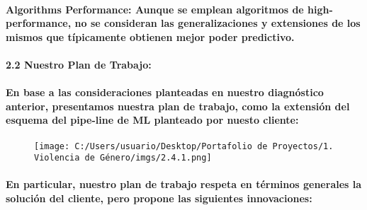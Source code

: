 \documentclass[]{article}
\let\oldparagraph\paragraph
\renewcommand{\paragraph}[1]{\oldparagraph{#1}\mbox{}}
\begin{document}
\begin{itemize}
  \paragraph{\texorpdfstring{\textbf{Algorithms Performance:} Aunque se
  emplean algoritmos de high-performance, no se consideran las
  generalizaciones y extensiones de los mismos que típicamente obtienen
  mejor poder
  predictivo.}{Algorithms Performance: Aunque se emplean algoritmos de high-performance, no se consideran las generalizaciones y extensiones de los mismos que típicamente obtienen mejor poder predictivo.}}\label{algorithms-performance-aunque-se-emplean-algoritmos-de-high-performance-no-se-consideran-las-generalizaciones-y-extensiones-de-los-mismos-que-tipicamente-obtienen-mejor-poder-predictivo.}
\end{itemize}

\paragraph{2.2 Nuestro Plan de Trabajo:}\label{nuestro-plan-de-trabajo}

\paragraph{En base a las consideraciones planteadas en nuestro
diagnóstico anterior, presentamos nuestra plan de trabajo, como la
extensión del esquema del pipe-line de ML planteado por nuesto
cliente:}\label{en-base-a-las-consideraciones-planteadas-en-nuestro-diagnostico-anterior-presentamos-nuestra-plan-de-trabajo-como-la-extension-del-esquema-del-pipe-line-de-ml-planteado-por-nuesto-cliente}

\begin{figure}
\centering
\texttt{[image: C:/Users/usuario/Desktop/Portafolio de Proyectos/1. Violencia de Género/imgs/2.4.1.png]}
\caption{}
\end{figure}

\paragraph{En particular, nuestro plan de trabajo respeta en términos
generales la solución del cliente, pero propone las siguientes
innovaciones:}\label{en-particular-nuestro-plan-de-trabajo-respeta-en-terminos-generales-la-solucion-del-cliente-pero-propone-las-siguientes-innovaciones}
\end{document}
